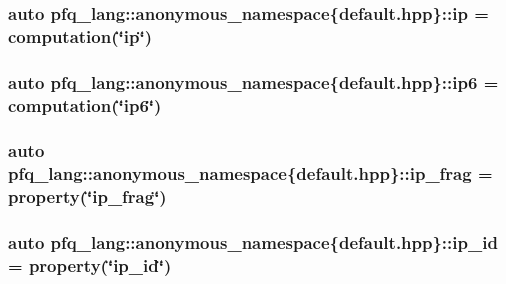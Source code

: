 \hypertarget{namespacepfq__lang_1_1anonymous__namespace_02default_8hpp_03_a27d30e7744c84a7cdc41a710ee16b885}{
\subsubsection[{ip}]{\setlength{\rightskip}{0pt plus 5cm}auto pfq\-\_\-lang\-::anonymous\-\_\-namespace\{default.\-hpp\}\-::ip = {\bf computation}(\char`\"{}ip\char`\"{})}}\label{namespacepfq__lang_1_1anonymous__namespace_02default_8hpp_03_a27d30e7744c84a7cdc41a710ee16b885}
\hypertarget{namespacepfq__lang_1_1anonymous__namespace_02default_8hpp_03_a566cbe8627dd2ae05071690ef64dbd12}{
\subsubsection[{ip6}]{\setlength{\rightskip}{0pt plus 5cm}auto pfq\-\_\-lang\-::anonymous\-\_\-namespace\{default.\-hpp\}\-::ip6 = {\bf computation}(\char`\"{}ip6\char`\"{})}}\label{namespacepfq__lang_1_1anonymous__namespace_02default_8hpp_03_a566cbe8627dd2ae05071690ef64dbd12}
\hypertarget{namespacepfq__lang_1_1anonymous__namespace_02default_8hpp_03_a29f207a5d209c3968f5d2e8f3c19c239}{
\subsubsection[{ip\-\_\-frag}]{\setlength{\rightskip}{0pt plus 5cm}auto pfq\-\_\-lang\-::anonymous\-\_\-namespace\{default.\-hpp\}\-::ip\-\_\-frag = {\bf property}(\char`\"{}ip\-\_\-frag\char`\"{})}}\label{namespacepfq__lang_1_1anonymous__namespace_02default_8hpp_03_a29f207a5d209c3968f5d2e8f3c19c239}
\hypertarget{namespacepfq__lang_1_1anonymous__namespace_02default_8hpp_03_a7e1fd2e2131451ca8afe2f8ab07b97a8}{
\subsubsection[{ip\-\_\-id}]{\setlength{\rightskip}{0pt plus 5cm}auto pfq\-\_\-lang\-::anonymous\-\_\-namespace\{default.\-hpp\}\-::ip\-\_\-id = {\bf property}(\char`\"{}ip\-\_\-id\char`\"{})}}\label{namespacepfq__lang_1_1anonymous__namespace_02default_8hpp_03_a7e1fd2e2131451ca8afe2f8ab07b97a8}
